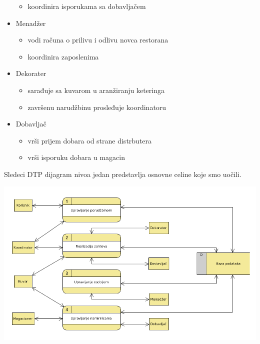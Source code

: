 \begin{itemize}
\begin{itemize}
        \item koordinira isporukama sa dobavljačem
    \end{itemize}
    \item Menadžer
    \begin{itemize}
        \item vodi računa o prilivu i odlivu novca restorana
        \item koordinira zaposlenima
    \end{itemize}
    \item Dekorater
    \begin{itemize}
        \item sarađuje sa kuvarom u aranžiranju keteringa
        \item završenu narudžbinu prosleđuje koordinatoru
    \end{itemize}
    \item Dobavljač
    \begin{itemize}
        \item vrši prijem dobara od strane distrbutera
        \item vrši isporuku dobara u magacin
    \end{itemize}
\end{itemize}


Sledeci DTP dijagram nivoa jedan predstavlja osnovne celine koje smo uočili. 
\begin{center}
\includegraphics[width = 160mm]{slike/DTP.jpg}
\end{center}
